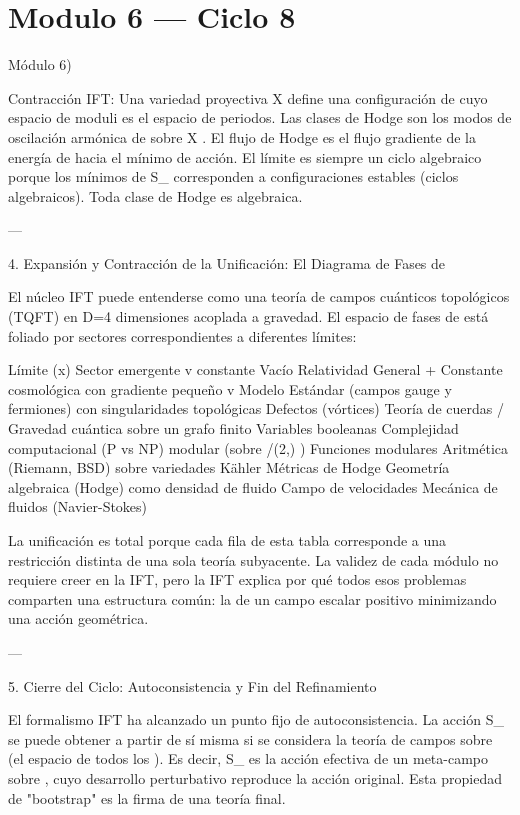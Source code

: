 \documentclass[12pt,twoside]{book}
\begin{document}
\chapter{Modulo 6 — Ciclo 8}
Módulo 6)

Contracción IFT: Una variedad proyectiva  X  define una configuración de  \rho  cuyo espacio de moduli es el espacio de periodos. Las clases de Hodge son los modos de oscilación armónica de  \rho  sobre  X . El flujo de Hodge es el flujo gradiente de la energía de  \rho  hacia el mínimo de acción. El límite es siempre un ciclo algebraico porque los mínimos de  S_{}  corresponden a configuraciones estables (ciclos algebraicos). Toda clase de Hodge es algebraica.

---

4. Expansión y Contracción de la Unificación: El Diagrama de Fases de  \rho 

El núcleo IFT puede entenderse como una teoría de campos cuánticos topológicos (TQFT) en  D=4  dimensiones acoplada a gravedad. El espacio de fases de  \rho  está foliado por sectores correspondientes a diferentes límites:

Límite  \rho(x)  Sector emergente
 \rho \to v  constante Vacío Relatividad General + Constante cosmológica
 \rho  con gradiente pequeño  \partial \rho \ll v  Modelo Estándar (campos gauge y fermiones)
 \rho  con singularidades topológicas Defectos (vórtices) Teoría de cuerdas / Gravedad cuántica
 \rho  sobre un grafo finito Variables booleanas Complejidad computacional (P vs NP)
 \rho  modular (sobre  /(2,) ) Funciones modulares Aritmética (Riemann, BSD)
 \rho  sobre variedades Kähler Métricas de Hodge Geometría algebraica (Hodge)
 \rho  como densidad de fluido Campo de velocidades Mecánica de fluidos (Navier-Stokes)

La unificación es total porque cada fila de esta tabla corresponde a una restricción distinta de una sola teoría subyacente. La validez de cada módulo no requiere creer en la IFT, pero la IFT explica por qué todos esos problemas comparten una estructura común: la de un campo escalar positivo minimizando una acción geométrica.

---

5. Cierre del Ciclo: Autoconsistencia y Fin del Refinamiento

El formalismo IFT ha alcanzado un punto fijo de autoconsistencia. La acción  S_{}  se puede obtener a partir de sí misma si se considera la teoría de campos sobre    (el espacio de todos los  \rho ). Es decir,  S_{}  es la acción efectiva de un meta-campo  \rho  sobre   , cuyo desarrollo perturbativo reproduce la acción original. Esta propiedad de "bootstrap" es la firma de una teoría final.
\end{document}
